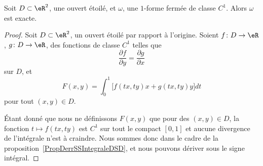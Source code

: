 \begin{theorem} \label{ThoMSofFxL}
	Soit \( D\subset\eR^2\), une ouvert étoilé, et \( \omega\), une \( 1\)-forme fermée de classe \( C^1\). Alors \( \omega\) est exacte.
\end{theorem}
\begin{proof}

	Soit \( D\subset\eR^2\), un ouvert étoilé par rapport à l'origine. Soient \( f\colon D\to \eR\), \( g\colon D\to \eR\), des fonctions de classe \( C^1\) telles que
	\begin{equation}
		\frac{ \partial f }{ \partial y }=\frac{ \partial g }{ \partial x }
	\end{equation}
	sur \( D\), et
	\begin{equation}		\label{EqIMDefFformI33}
		F(x,y)=\int_0^1\big[  f(tx,ty)x+g(tx,ty)y  \big]dt
	\end{equation}
	pour tout \( (x,y)\in D\).

	Étant donné que nous ne définissons \( F(x,y)\) que pour des \( (x,y)\in D\), la fonction \( t\mapsto f(tx,ty)\) est \( C^1\) sur tout le compact \( [0,1]\) et aucune divergence de l'intégrale n'est à craindre. Nous sommes donc dans le cadre de la proposition~\ref{PropDerrSSIntegraleDSD}, et nous pouvons dériver sous le signe intégral.


\end{proof}
